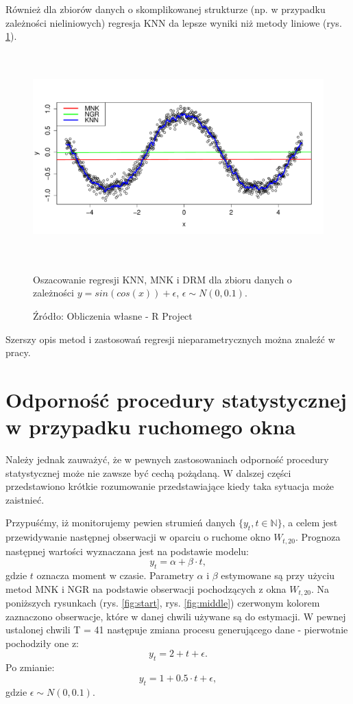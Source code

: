 \documentclass[man,mfu]{mgrwms}
\begin{document}
Również dla zbiorów danych o skomplikowanej strukturze (np. w przypadku zależności nieliniowych) regresja KNN da lepsze wyniki niż metody liniowe (rys. \ref{sinuscosinus}).

\begin{figure}
\centering
\includegraphics[width=120mm,height = 80mm]{sinknn}
\caption{Oszacowanie regresji KNN, MNK i DRM dla zbioru danych o zależności $y = sin(cos(x))+\epsilon$, $\epsilon \sim N(0,0.1)$.}
\caption*{Źródło: Obliczenia własne - R Project}
\label{sinuscosinus}
\end{figure}

Szerszy opis metod i zastosowań regresji nieparametrycznych można znaleźć w pracy\cite{Ania}.


\section{\label{s:lab}Odporność procedury statystycznej w przypadku ruchomego okna}

Należy jednak zauważyć, że w pewnych zastosowaniach odporność procedury statystycznej może nie zawsze być cechą pożądaną. W dalszej części przedstawiono krótkie rozumowanie przedstawiające kiedy taka sytuacja może zaistnieć.

Przypuśćmy, iż monitorujemy pewien strumień danych $\{y_t, t \in \mathbb{N}\}$, a celem jest przewidywanie następnej obserwacji w oparciu o ruchome okno $W_{t,20}$. Prognoza następnej wartości wyznaczana jest na podstawie modelu:
\begin{equation}\label{e:model}
y_t = \alpha + \beta \cdot t,
\end{equation}
gdzie $t$ oznacza moment w czasie. Parametry $\alpha$ i $\beta$ estymowane są przy użyciu metod MNK i NGR na podstawie obserwacji pochodzących z okna $W_{t,20}$. Na poniższych rysunkach (rys. \ref{fig:start}, rys. \ref{fig:middle}) czerwonym kolorem zaznaczono obserwacje, które w danej chwili używane są do estymacji. W pewnej ustalonej chwili T = 41 następuje zmiana procesu generującego dane - pierwotnie pochodziły one z:
\begin{equation}
y_t = 2 + t + \epsilon.
\end{equation}
Po zmianie:
\begin{equation}
y_t = 1 + 0.5\cdot t + \epsilon,
\end{equation}
gdzie $\epsilon \sim N(0,0.1)$.
\end{document}
